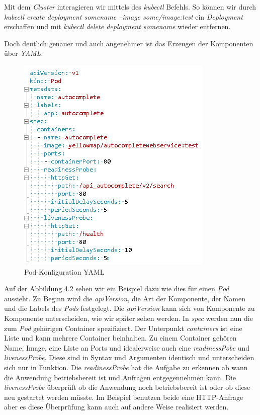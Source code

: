 \documentclass[12pt,a4paper]{scrartcl}
\begin{document}
Mit dem \emph{Cluster} interagieren wir mittels des \emph{kubectl} Befehls. So können wir durch \emph{kubectl create deployment somename --image some/image:test} ein \emph{Deployment} erschaffen und mit \emph{kubectl delete deployment somename} wieder entfernen. 

Doch deutlich genauer und auch angenehmer ist das Erzeugen der Komponenten über \emph{YAML}. 

\begin{figure}[h!]
	\centering
	\includegraphics[scale=1]{KubeYmlPod.png}
	\caption[Screenshot]{Pod-Konfiguration YAML}
\end{figure}

Auf der Abbildung 4.2 sehen wir ein Beispiel dazu wie dies für einen \emph{Pod} aussieht. Zu Beginn wird die \emph{apiVersion}, die Art der Komponente, der Namen und die Labels des \emph{Pods} festgelegt. Die \emph{apiVersion} kann sich von Komponente zu Komponente unterscheiden, wie wir später sehen werden. In \emph{spec} werden nun die zum \emph{Pod} gehörigen Container spezifiziert. Der Unterpunkt \emph{containers} ist eine Liste und kann mehrere Container beinhalten. Zu einem Container gehören Name, Image, eine Liste an Ports und idealerweise auch eine \emph{readinessPobe} und \emph{livenessProbe}.  Diese sind in Syntax und Argumenten identisch und unterscheiden sich nur in Funktion. Die \emph{readinessProbe} hat die Aufgabe zu erkennen ab wann die Anwendung betriebsbereit ist und Anfragen entgegennehmen kann. Die \emph{livenessProbe} überprüft ob die Anwendung noch betriebsbereit ist oder ob diese neu gestartet werden müsste. Im Beispiel benutzen beide eine HTTP-Anfrage aber es diese Überprüfung kann auch auf andere Weise realisiert werden.
\end{document}
